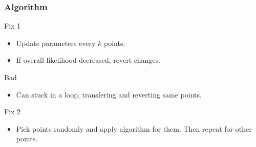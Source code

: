 \documentclass[9pt]{beamer}
\begin{document}
    \begin{frame}
        \frametitle{Algorithm}
        \begin{block}{Fix 1}
            \begin{itemize}
                \item Update parameters every $k$ points.
                \item If overall likelihood decreased, revert changes.
            \end{itemize}
        \end{block}

        \begin{block}{Bad}
            \begin{itemize}
                \item Can stuck in a loop, transfering and reverting same points.
            \end{itemize}
        \end{block}

        \begin{block}{Fix 2}
            \begin{itemize}
                \item Pick points randomly and apply algorithm for them. Then repeat for other points.
            \end{itemize}
        \end{block}

    \end{frame}
\end{document}
